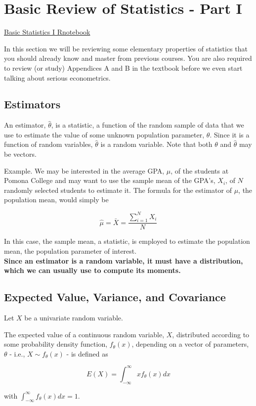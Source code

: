 \section{Basic Review of Statistics - Part I}

\href{https://github.com/Bonorinoa/ECON-167/blob/main/Code/Basic_Stats_I.Rmd}{Basic Statistics I Rnotebook}

In this section we will be reviewing some elementary properties of statistics that you should already know and master from previous courses. You are also required to review (or study) Appendices A and B in the textbook before we even start talking about serious econometrics.

\subsection{Estimators}

\begin{definition}[Estimator]
    An estimator, $\widehat{\theta}$, is a statistic, a function of the random sample of data that we use to estimate the value of some unknown population parameter, $\theta$. Since it is a function of random variables, $\widehat{\theta}$ is a random variable. Note that both $\theta$ and $\widehat{\theta}$ may be vectors.
\end{definition}

Example. We may be interested in the average GPA, $\mu$, of the students at Pomona College and may want to use the sample mean of the GPA's, $X_{i}$, of $N$ randomly selected students to estimate it. The formula for the estimator of $\mu$, the population mean, would simply be

$$
\widehat{\mu}=\bar{X}=\frac{\sum_{i=1}^{N} X_{i}}{N}
$$

In this case, the sample mean, a statistic, is employed to estimate the population mean, the population parameter of interest.
\\
\textbf{Since an estimator is a random variable, it must have a distribution, which we can usually use to compute its moments.}

\subsection{Expected Value, Variance, and Covariance}
Let $X$ be a univariate random variable.

\begin{definition}
    The expected value of a continuous random variable, $X$, distributed according to some probability density function, $f_{\theta}(x)$, depending on a vector of parameters, $\theta$ - i.e., $X \sim f_{\theta}(x)$ - is defined as
    
    $$
    E(X)=\int_{-\infty}^{\infty} x f_{\theta}(x) d x
    $$
    
    with $\int_{-\infty}^{\infty} f_{\theta}(x) d x=1$.
\end{definition}

